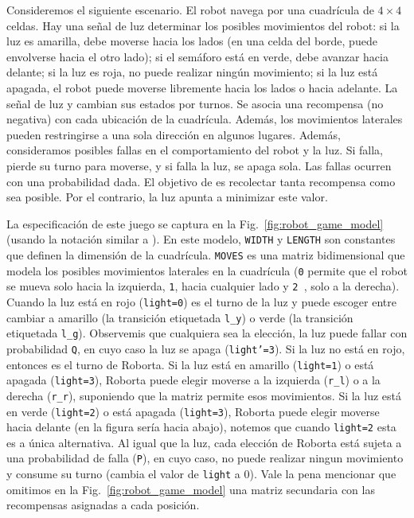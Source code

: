 Consideremos el siguiente escenario. El robot \roborta navega por una cuadrícula de $4 \times 4$ celdas. Hay una señal de luz
determinar los posibles movimientos del robot: si la luz es amarilla, debe moverse hacia los lados (en una celda del borde, \roborta puede envolverse hacia el otro lado); si el semáforo está en verde, debe avanzar hacia delante; si la luz es roja, no puede realizar ningún movimiento; si la luz está apagada, el robot puede moverse libremente hacia los lados o hacia adelante. La señal de luz y \roborta cambian sus estados por turnos. Se asocia una recompensa (no negativa) con cada ubicación de la cuadrícula. Además, los movimientos laterales pueden restringirse a una sola dirección en algunos lugares.
Además, consideramos posibles fallas en el comportamiento del robot y la luz. Si \roborta falla, pierde su turno para moverse, y si falla la luz, se apaga sola. Las fallas ocurren con una probabilidad dada. El objetivo de \roborta es recolectar tanta recompensa como sea posible. Por el contrario, la luz apunta a minimizar este valor.

La especificación de este juego se captura en la Fig.~\ref{fig:robot_game_model} (usando la notación similar a {\Prism} \cite{DBLP:conf/cav/KwiatkowskaNP11}).
En este modelo, \texttt{WIDTH} y \texttt{LENGTH} son constantes que definen la dimensión de la cuadrícula. \texttt{MOVES} es una matriz bidimensional que modela los posibles movimientos laterales en la cuadrícula (\texttt{0} permite que el robot se mueva solo hacia la izquierda, \texttt{1}, hacia cualquier lado y \texttt{2 }, solo a la derecha). Cuando la luz está en rojo (\texttt{light=0}) es el turno de la luz y puede escoger entre cambiar a amarillo (la transición etiquetada \texttt{l\_y}) o verde (la transición etiquetada \texttt{l\_g}). Observemis que cualquiera sea la elección, la luz puede fallar con probabilidad \texttt{Q}, en cuyo caso la luz se apaga (\texttt{light’=3}). Si la luz no está en rojo, entonces es el turno de Roborta. Si la luz está en amarillo (\texttt{light=1}) o está apagada (\texttt{light=3}), Roborta puede elegir moverse a la izquierda (\texttt{r\_l}) o a la derecha (\texttt{r\_r}), suponiendo que la matriz permite esos movimientos. Si la luz está en verde (\texttt{light=2}) o está apagada (\texttt{light=3}), Roborta puede elegir moverse hacia delante (en la figura sería hacia abajo), notemos que cuando \texttt{light=2} esta es a única alternativa. Al igual que la luz, cada elección de Roborta está sujeta a una probabilidad de falla (\texttt{P}), en cuyo caso, no puede realizar ningun movimiento y consume su turno (cambia el valor de \texttt{light} a 0). Vale la pena mencionar que omitimos en la Fig.~\ref{fig:robot_game_model} una matriz secundaria con las recompensas asignadas a cada posición.

